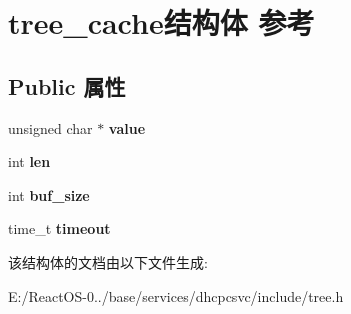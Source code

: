\hypertarget{structtree__cache}{}\section{tree\+\_\+cache结构体 参考}
\label{structtree__cache}
\subsection*{Public 属性}
\begin{DoxyCompactItemize}
\item 
\mbox{\label{structtree__cache_a497c46f5563c8df30c37bde1b964d17f}} 
unsigned char $\ast$ {\bfseries value}
\item 
\mbox{\label{structtree__cache_aae895a827bbfca2df4e98c349a80bcbd}} 
int {\bfseries len}
\item 
\mbox{\label{structtree__cache_a0ebeeab20db1b373f15d04b666ce97b4}} 
int {\bfseries buf\+\_\+size}
\item 
\mbox{\label{structtree__cache_a84235fdd4292a21599ccf2ff7a45a84e}} 
time\+\_\+t {\bfseries timeout}
\end{DoxyCompactItemize}


该结构体的文档由以下文件生成\+:\begin{DoxyCompactItemize}
\item 
E\+:/\+React\+O\+S-\/0../base/services/dhcpcsvc/include/tree.\+h\end{DoxyCompactItemize}
